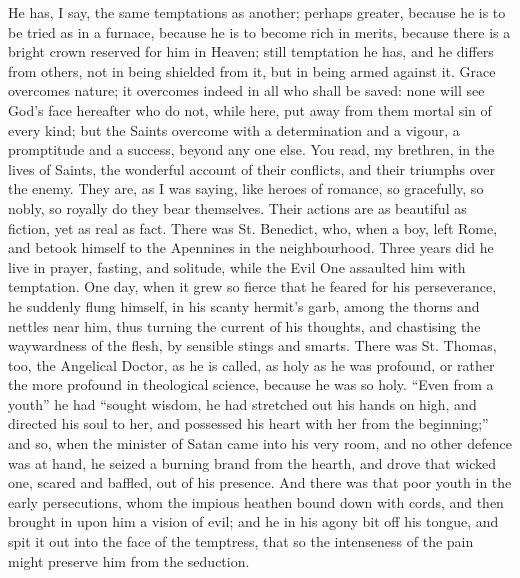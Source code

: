 He has, I say, the same temptations as another; perhaps greater,
because he is to be tried as in a furnace, because he is to become
rich in merits, because there is a bright crown reserved for him in
Heaven; still temptation he has, and he differs from others, not in
being shielded from it, but in being armed against it. Grace overcomes
nature; it overcomes indeed in all who shall be saved: none will see
God's face hereafter who do not, while here, put away from them mortal
sin of every kind; but the Saints overcome with a determination and a
vigour, a promptitude and a success, beyond any one else. You read, my
brethren, in the lives of Saints, the wonderful account of their
conflicts, and their triumphs over the enemy. They are, as I was
saying, like heroes of romance, so gracefully, so nobly, so royally do
they bear themselves. Their actions are as beautiful as fiction, yet
as real as fact. There was St. Benedict, who, when a boy, left Rome,
and betook himself to the Apennines in the neighbourhood. Three years
did he live in prayer, fasting, and solitude, while the Evil One
assaulted him with temptation. One day, when it grew so fierce that he
feared for his perseverance, he suddenly flung himself, in his scanty
hermit's garb, among the thorns and nettles near him, thus turning the
current of his thoughts, and chastising the waywardness of the flesh,
by sensible stings and smarts. There was St. Thomas, too, the
Angelical Doctor, as he is called, as holy as he was profound, or
rather the more profound in theological science, because he was so
holy. ``Even from a youth'' he had ``sought wisdom, he had
stretched out his hands on high, and directed his soul to her, and
possessed his heart with her from the beginning;'' and so, when
the minister of Satan came into his very room, and no other defence
was at hand, he seized a burning brand from the hearth, and drove that
wicked one, scared and baffled, out of his presence. And there was
that poor youth in the early persecutions, whom the impious heathen
bound down with cords, and then brought in upon him a vision of evil;
and he in his agony bit off his tongue, and spit it out into the face
of the temptress, that so the intenseness of the pain might preserve
him from the seduction.

